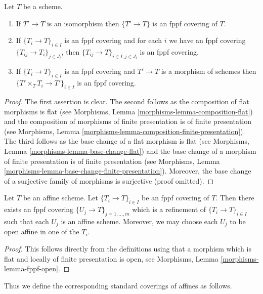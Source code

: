\begin{lemma}
\label{lemma-fppf}
Let $T$ be a scheme.
\begin{enumerate}
\item If $T' \to T$ is an isomorphism then $\{T' \to T\}$
is an fppf covering of $T$.
\item If $\{T_i \to T\}_{i\in I}$ is an fppf covering and for each
$i$ we have an fppf covering $\{T_{ij} \to T_i\}_{j\in J_i}$, then
$\{T_{ij} \to T\}_{i \in I, j\in J_i}$ is an fppf covering.
\item If $\{T_i \to T\}_{i\in I}$ is an fppf covering
and $T' \to T$ is a morphism of schemes then
$\{T' \times_T T_i \to T'\}_{i\in I}$ is an fppf covering.
\end{enumerate}
\end{lemma}

\begin{proof}
The first assertion is clear.
The second follows as the composition of flat morphisms is flat
(see Morphisms, Lemma \ref{morphisms-lemma-composition-flat})
and the composition of morphisms of finite presentation is
of finite presentation
(see Morphisms, Lemma \ref{morphisms-lemma-composition-finite-presentation}).
The third follows as the base change of a flat morphism is flat
(see Morphisms, Lemma \ref{morphisms-lemma-base-change-flat})
and the base change of a morphism of finite presentation is
of finite presentation
(see Morphisms, Lemma \ref{morphisms-lemma-base-change-finite-presentation}).
Moreover, the base change of a surjective family of morphisms is surjective
(proof omitted).
\end{proof}

\begin{lemma}
\label{lemma-fppf-affine}
Let $T$ be an affine scheme.
Let $\{T_i \to T\}_{i \in I}$ be an fppf covering of $T$.
Then there exists an fppf covering
$\{U_j \to T\}_{j = 1, \ldots, m}$ which is a refinement
of $\{T_i \to T\}_{i \in I}$ such that each $U_j$ is an affine
scheme. Moreover, we may choose each $U_j$ to be open affine
in one of the $T_i$.
\end{lemma}

\begin{proof}
This follows directly from the definitions using that a
morphism which is flat and locally of finite presentation is open,
see Morphisms, Lemma \ref{morphisms-lemma-fppf-open}.
\end{proof}

\noindent
Thus we define the corresponding standard coverings of affines as follows.


